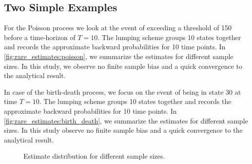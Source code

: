 \subsection{Two Simple Examples}
For the Poisson process we look at the event of exceeding a threshold of \num{150} before a time-horizon of $T=10$.
The lumping scheme groups \num{10} states together and records the approximate backward probabilities for \num{10} time points.
In \autoref{fig:rare_estimates:poisson}, we summarize the estimates for different sample sizes.
In this study, we observe no finite sample bias and a quick convergence to the analytical result.

In case of the birth-death process, we focus on the event of being in state \num{30} at time $T=10$.
The lumping scheme groups \num{10} states together and records the approximate backward probabilities for \num{10} time points.
In \autoref{fig:rare_estimates:birth_death}, we summarize the estimates for different sample sizes.
In this study observe no finite sample bias and a quick convergence to the analytical result.
\begin{figure}[htb]
    \centering
    \caption[Estimates for different sample sizes]{\label{fig:rare_estimates}Estimate distribution for different sample sizes.}
\end{figure}
